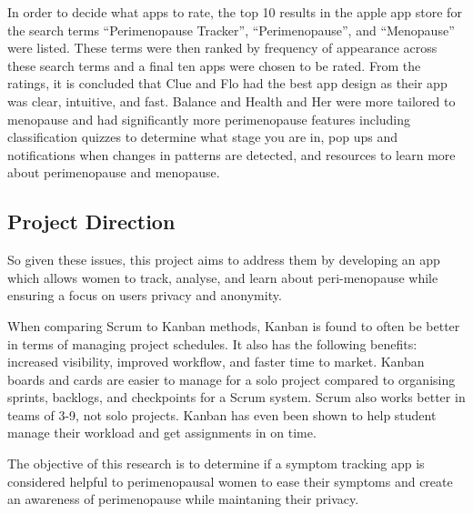 In order to decide what apps to rate, the top 10 results in the apple app store for the search terms “Perimenopause Tracker”, “Perimenopause”, and “Menopause” were listed. These terms were then ranked by frequency of appearance across these search terms and a final ten apps were chosen to be rated. From the ratings, it is concluded that Clue and Flo had the best app design as their app was clear, intuitive, and fast. Balance and Health and Her were more tailored to menopause and had significantly more perimenopause features including classification quizzes to determine what stage you are in, pop ups and notifications when changes in patterns are detected, and resources to learn more about perimenopause and menopause. 

\subsection{Project Direction}


So given these issues, this project aims to address them by developing an app which allows women to track, analyse, and learn about peri-menopause while ensuring a focus on users privacy and anonymity. 

When comparing Scrum to Kanban methods, Kanban is found to often be better in terms of managing project schedules\cite{Lei2017}. It also has the following benefits: increased visibility,  improved workflow, and faster time to market\cite{Ahmad2018}. Kanban boards and cards are easier to manage for a solo project compared to organising sprints, backlogs, and checkpoints for a Scrum system. Scrum also works better in teams of 3-9, not solo projects\cite{Mundra2013Practical}. Kanban has even been shown to help student manage their workload and get assignments in on time\cite{Sheng2021Kanban}. 

The objective of this research is to determine if a symptom tracking app is considered helpful to perimenopausal women to ease their symptoms and create an awareness of perimenopause while maintaning their privacy. 

